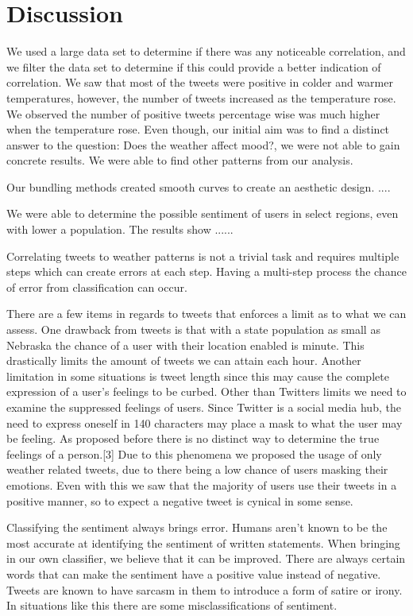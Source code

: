 \section{Discussion}

We used a large data set to determine if there was any noticeable correlation, and we filter the data set to determine if this could provide a better indication of correlation. We saw that most of the tweets were positive in colder and warmer temperatures, however, the number of tweets increased as the temperature rose. We observed the number of positive tweets percentage wise was much higher when the temperature rose. Even though, our initial aim was to find a distinct answer to the question: Does the weather affect mood?, we were not able to gain concrete results. We were able to find other patterns from our analysis.

Our bundling methods created smooth curves to create an aesthetic design. ....

We were able to determine the possible sentiment of users in select regions, even with lower a population. The results show ......

Correlating tweets to weather patterns is not a trivial task and requires multiple steps which can create errors at each step. Having a multi-step process the chance of error from classification can occur.

There are a few items in regards to tweets that enforces a limit as to what we can assess. One drawback from tweets is that with a state population as small as Nebraska the chance of a user with their location enabled is minute. This drastically limits the amount of tweets we can attain each hour. Another limitation in some situations is tweet length since this may cause the complete expression of a user's feelings to be curbed. Other than Twitters limits we need to examine the suppressed feelings of users. Since Twitter is a social media hub, the need to express oneself in 140 characters may place a mask to what the user may be feeling. As proposed before there is no distinct way to determine the true feelings of a person.[3] Due to this phenomena we proposed the usage of only weather related tweets, due to there being a low chance of users masking their emotions. Even with this we saw that the majority of users use their tweets in a positive manner, so to expect a negative tweet is cynical in some sense.

Classifying the sentiment always brings error. Humans aren't known to be the most accurate at identifying the sentiment of written statements. \cite{pangthumbs} When bringing in our own classifier, we believe that it can be improved. There are always certain words that can make the sentiment have a positive value instead of negative. Tweets are known to have sarcasm in them to introduce a form of satire or irony. \cite{riloff2013sarcasm} In situations like this there are some misclassifications of sentiment.


